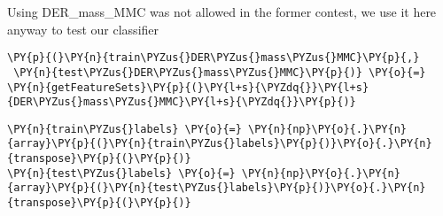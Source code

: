     Using DER\_mass\_MMC was not allowed in the former contest, we use it
here anyway to test our classifier


{\par%
\vspace{-1\baselineskip}%
}%
\begin{notebookcell}[]%
\begin{addmargin}[\cellleftmargin]{0em}%
{\smaller%
\par%
%
\vspace{-1\smallerfontscale}%
\begin{Verbatim}[commandchars=\\\{\}]
\PY{p}{(}\PY{n}{train\PYZus{}DER\PYZus{}mass\PYZus{}MMC}\PY{p}{,}
 \PY{n}{test\PYZus{}DER\PYZus{}mass\PYZus{}MMC}\PY{p}{)} \PY{o}{=} \PY{n}{getFeatureSets}\PY{p}{(}\PY{l+s}{\PYZdq{}}\PY{l+s}{DER\PYZus{}mass\PYZus{}MMC}\PY{l+s}{\PYZdq{}}\PY{p}{)}
\end{Verbatim}
%
\par%
\vspace{-1\smallerfontscale}}%
\end{addmargin}
\end{notebookcell}



{\par%
\vspace{-1\baselineskip}%
}%
\begin{notebookcell}[]%
\begin{addmargin}[\cellleftmargin]{0em}%
{\smaller%
\par%
%
\vspace{-1\smallerfontscale}%
\begin{Verbatim}[commandchars=\\\{\}]
\PY{n}{train\PYZus{}labels} \PY{o}{=} \PY{n}{np}\PY{o}{.}\PY{n}{array}\PY{p}{(}\PY{n}{train\PYZus{}labels}\PY{p}{)}\PY{o}{.}\PY{n}{transpose}\PY{p}{(}\PY{p}{)}
\PY{n}{test\PYZus{}labels} \PY{o}{=} \PY{n}{np}\PY{o}{.}\PY{n}{array}\PY{p}{(}\PY{n}{test\PYZus{}labels}\PY{p}{)}\PY{o}{.}\PY{n}{transpose}\PY{p}{(}\PY{p}{)}
\end{Verbatim}
%
\par%
\vspace{-1\smallerfontscale}}%
\end{addmargin}
\end{notebookcell}


